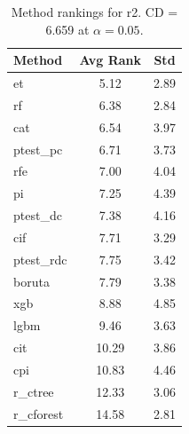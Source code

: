\begin{table}[h]
\centering
\caption{Method rankings for r2. CD = 6.659 at $\alpha=0.05$.}
\label{tab:ranks_r2}
\begin{tabular}{lcc}
\toprule
Method & Avg Rank & Std \\
\midrule
et & 5.12 & 2.89 \\
rf & 6.38 & 2.84 \\
cat & 6.54 & 3.97 \\
ptest_pc & 6.71 & 3.73 \\
rfe & 7.00 & 4.04 \\
pi & 7.25 & 4.39 \\
ptest_dc & 7.38 & 4.16 \\
cif & 7.71 & 3.29 \\
ptest_rdc & 7.75 & 3.42 \\
boruta & 7.79 & 3.38 \\
xgb & 8.88 & 4.85 \\
lgbm & 9.46 & 3.63 \\
cit & 10.29 & 3.86 \\
cpi & 10.83 & 4.46 \\
r_ctree & 12.33 & 3.06 \\
r_cforest & 14.58 & 2.81 \\
\bottomrule
\end{tabular}
\end{table}